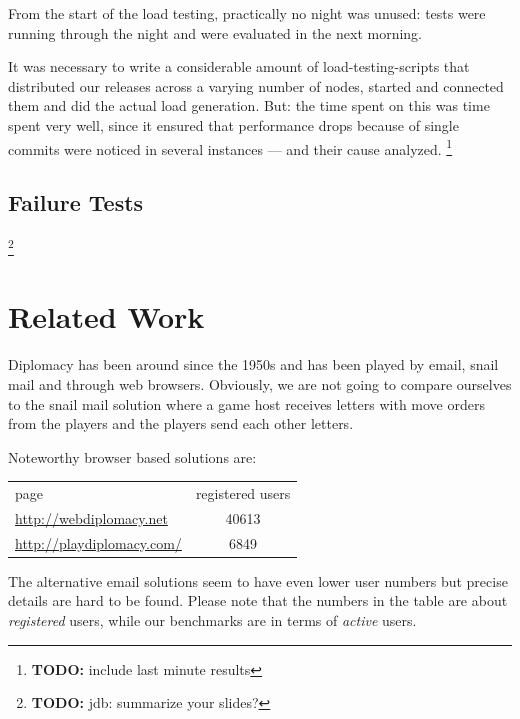 \documentclass[11pt,a4paper]{report}
\newcommand{\hi}[1]{{\color{red}\em #1\/}\\}
\newcommand{\todo}[1]{\footnote{{\color{red} {\bf TODO:} #1}}}
\begin{document}
From the start of the load testing, practically no night was unused: tests were
running through the night and were evaluated in the next morning.

It was necessary to write a considerable amount of load-testing-scripts that
distributed our releases across a varying number of nodes, started and connected
them and did the actual load generation. But: the time spent on this was time
spent very well, since it ensured that performance drops because of single
commits were noticed in several instances --- and their cause analyzed.
\todo{include last minute results}
\section{Failure Tests}
\todo{jdb: summarize your slides?}

\chapter{Related Work}


Diplomacy has been around since the 1950s and has been played by email, snail
mail and through web browsers. Obviously, we are not going to compare ourselves
to the snail mail solution where a game host receives letters with move orders
from the players and the players send each other letters.

Noteworthy browser based solutions are:\\
\begin{tabular}{lc}
  page                            & registered users \\
  \url{http://webdiplomacy.net}   & 40613 \\
  \url{http://playdiplomacy.com/} & 6849
\end{tabular}

The alternative email solutions seem to have even lower user numbers but precise
details are hard to be found. Please note that the numbers in
the table are about {\em registered\/} users, while our benchmarks are in terms
of {\em active\/} users.
\end{document}
